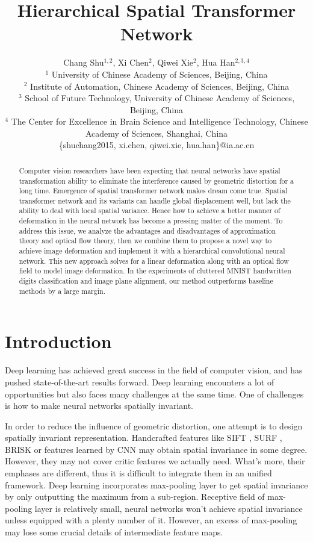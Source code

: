 \documentclass{article}
\title{Hierarchical Spatial Transformer Network}
\author{
Chang Shu$^{1,2}$,
Xi Chen$^{2}$,
Qiwei Xie$^{2}$,
Hua Han$^{2,3,4}$
\\
$^{1}$ University of Chinese Academy of Sciences, Beijing, China \\
$^{2}$ Institute of Automation, Chinese Academy of Sciences, Beijing, China\\
$^{3}$ School of Future Technology, University of Chinese Academy of Sciences, Beijing, China  \\
$^{4}$ The Center for Excellence in Brain Science and Intelligence Technology, Chinese Academy of Sciences, Shanghai, China\\
%
\{shuchang2015, xi.chen, qiwei.xie, hua.han\}@ia.ac.cn
}
\begin{document}
\maketitle

\begin{abstract}
Computer vision researchers have been expecting that neural networks have spatial transformation ability to eliminate the interference caused by geometric distortion for a long time.
Emergence of spatial transformer network makes dream come true.
Spatial transformer network and its variants can handle global displacement well, but lack the ability to deal with local spatial variance.
Hence how to achieve a better manner of deformation in the neural network has become a pressing matter of the moment.
To address this issue, we analyze the advantages and disadvantages of approximation theory and optical flow theory, then we combine them to propose a novel way to achieve image deformation and implement it with a hierarchical convolutional neural network.
This new approach solves for a linear deformation along with an optical flow field to model image deformation.
In the experiments of cluttered MNIST handwritten digits classification and image plane alignment, our method outperforms baseline methods by a large margin.
\end{abstract}

\section{Introduction}
Deep learning has achieved great success in the field of computer vision, and has pushed state-of-the-art results forward.
Deep learning encounters a lot of opportunities but also faces many challenges at the same time.
One of challenges is how to make neural networks spatially invariant.

In order to reduce the influence of geometric distortion, one attempt is to design spatially invariant representation.
Handcrafted features like SIFT \cite{Lowe2004Distinctive}, SURF \cite{Bay2008Speeded}, BRISK \cite{Leutenegger2011BRISK} or features learned by CNN \cite{Bruna2012Invariant,Angjoo2014Locally,Sohn2012Learning,Stollenga2014Deep} may obtain spatial invariance in some degree.
However, they may not cover critic features we actually need.
What's more, their emphases are different, thus it is difficult to integrate them in an unified framework.
Deep learning incorporates max-pooling layer to get spatial invariance by only outputting the maximum from a sub-region.
Receptive field of max-pooling layer is relatively small, neural networks won't achieve spatial invariance unless equipped with a plenty number of it.
However, an excess of max-pooling may lose some crucial details of intermediate feature maps.
\end{document}
